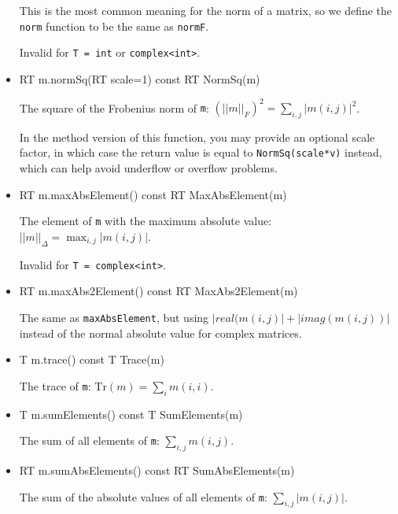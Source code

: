 \documentclass[twoside,letterpaper,11pt]{article}
\renewcommand{\tt}[1]{{\lstinline {#1}}}
\begin{document}
\begin{itemize}
This is the most common meaning for the norm of a matrix, so we
define the \tt{norm} function to be the same as \tt{normF}.

Invalid for \tt{T = int} or \tt{complex<int>}.

\item
\begin{tmvcode}
RT m.normSq(RT scale=1) const
RT NormSq(m)
\end{tmvcode}
The square of the Frobenius norm of \tt{m}: 
$(||m||_F)^2 = \sum_{i,j} |m(i,j)|^2$.

In the method version of this function, you may provide an optional scale factor,
in which case the return value is equal to \tt{NormSq(scale*v)} instead, 
which can help avoid underflow or overflow problems.

\item
\begin{tmvcode}
RT m.maxAbsElement() const
RT MaxAbsElement(m)
\end{tmvcode}
The element of \tt{m} with the maximum absolute value: 
$||m||_\Delta = \max_{i,j} |m(i,j)|$.  

Invalid for \tt{T = complex<int>}.

\item
\begin{tmvcode}
RT m.maxAbs2Element() const
RT MaxAbs2Element(m)
\end{tmvcode}
The same as \tt{maxAbsElement}, but using $|real(m(i,j)| + |imag(m(i,j))|$ instead
of the normal absolute value for complex matrices.

\item
\begin{tmvcode}
T m.trace() const
T Trace(m)
\end{tmvcode}
The trace of \tt{m}: $\mathrm{Tr}(m) = \sum_i m(i,i)$.

\item
\begin{tmvcode}
T m.sumElements() const
T SumElements(m)
\end{tmvcode}
The sum of all elements of \tt{m}: $\sum_{i,j} m(i,j)$.

\item
\begin{tmvcode}
RT m.sumAbsElements() const
RT SumAbsElements(m)
\end{tmvcode}
The sum of the absolute values of all elements of \tt{m}: $\sum_{i,j} |m(i,j)|$.


\end{itemize}
\end{document}
